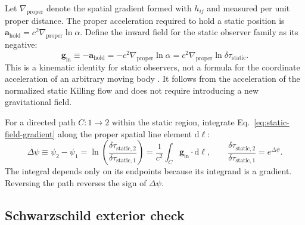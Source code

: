 \documentclass[12pt]{article}
\begin{document}
Let $\nabla_{\mathrm{proper}}$ denote the spatial gradient formed with $h_{ij}$ and measured per unit proper distance. The proper acceleration required to hold a static position is $\mathbf{a}_{\mathrm{hold}}=c^2\nabla_{\mathrm{proper}}\ln\alpha$. Define the inward field for the static observer family as its negative:
\begin{equation}
  \mathbf{g}_{\mathrm{in}}
  \equiv-\mathbf{a}_{\mathrm{hold}}
  =-c^2\nabla_{\mathrm{proper}}\ln\alpha
  =c^2\nabla_{\mathrm{proper}}\ln\delta\tau_{\mathrm{static}}.
  \label{eq:static-field-gradient}
\end{equation}
This is a kinematic identity for static observers, not a formula for the coordinate acceleration of an arbitrary moving body \cite{LMP6,Wald,SantiagoVisser}. It follows from the acceleration of the normalized static Killing flow and does not require introducing a new gravitational field.

For a directed path $C:1\to2$ within the static region, integrate Eq.~\eqref{eq:static-field-gradient} along the proper spatial line element $\mathrm{d}\boldsymbol{\ell}$:
\begin{equation}
  \Delta\psi\equiv\psi_2-\psi_1
  =\ln\!\left(\frac{\delta\tau_{\mathrm{static},2}}
                         {\delta\tau_{\mathrm{static},1}}\right)
  =\frac{1}{c^2}\int_C\mathbf{g}_{\mathrm{in}}
    \cdot\mathrm{d}\boldsymbol{\ell},
  \qquad
  \frac{\delta\tau_{\mathrm{static},2}}
       {\delta\tau_{\mathrm{static},1}}=e^{\Delta\psi}.
  \label{eq:static-endpoint-identity}
\end{equation}
The integral depends only on its endpoints because its integrand is a gradient. Reversing the path reverses the sign of $\Delta\psi$.

\subsection{Schwarzschild exterior check}
\end{document}
